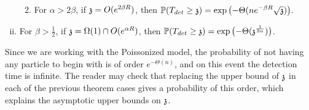 \begin{theorem}
\begin{enumerate}[(i)]
\begin{enumerate}
    \smallskip
    \item\label{thm:mixed-itm3}
    For $\alpha>2\beta$, if $\ss= O(e^{2\beta R})$, then
    $\displaystyle
    \PP (T_{det} \ge \ss)=\exp\big({-}\Theta(ne^{-\beta R}\sqrt{\ss})\big).$
\end{enumerate}
\item\label{thm:mixed-itm4}
For $\beta>\tfrac{1}{2}$, if $\ss= \Omega(1)\cap O(e^{\alpha R})$, then
    $\displaystyle
    \PP (T_{det} \ge \ss)=\exp\big({-}\Theta(\ss^{\frac{1}{2\alpha}})\big)$.
\end{enumerate}
\end{theorem}

\begin{remark}
Since we are working with the Poissonized model, the probability of not having any particle to begin with is of order $e^{-\Theta(n)}$, and on this event the detection time is infinite. The reader may check that replacing the upper bound of $\ss$ in each of the previous theorem cases gives a probability of this order, which explains the asymptotic upper bounds on $\ss$. 
\end{remark}

